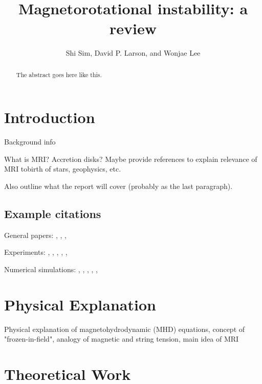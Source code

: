 \documentclass{jfm}
\title[Magnetorotational instability]{Magnetorotational instability: a review}
\author[S. Sim, D.~P. Larson, and W. Lee]{Shi Sim, David P. Larson, 
    and Wonjae Lee}
\affiliation{University of California, San Diego}
\begin{document}
\maketitle


\begin{abstract}
The abstract goes here like this.
\end{abstract}


\section{Introduction}
\label{sec:intro}
Background info

What is MRI? Accretion disks? Maybe provide references to explain relevance of 
MRI tobirth of stars, geophysics, etc.

Also outline what the report will cover (probably as the last paragraph).


\subsection{Example citations}
General papers: \cite{Julien2010}, \cite{Chandrasekhar1960}, \cite{Acheson1973},
\cite{Balbus1991}

Experiments: \cite{Gailitis2002}, \cite{Sisan2004}, \cite{Stefani2006},
\cite{Stefani2007}, \cite{Ji2010}, \cite{Seilmayer2012}

Numerical simulations: \cite{Kageyama2004}, \cite{Liu2008}, \cite{Gissinger2011}, 
\cite{Travnikov2011}, \cite{Kirillov2012}, \cite{Zhao2012}



\section{Physical Explanation}
Physical explanation of magnetohydrodynamic (MHD) equations, concept of "frozen-in-field",
analogy of magnetic and string tension, main idea of MRI



\section{Theoretical Work}
\label{sec:theory}
\end{document}
